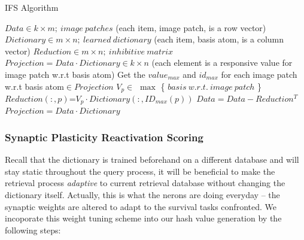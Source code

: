 \documentclass[letterpaper]{article}
\begin{document}
\begin{algorithm}[h]
  \caption{IFS Algorithm}
  \begin{algorithmic}[1]      
    \State $Data  \in k \times m;\ image\ patches  $ (each item, image patch, is a row vector)
    \State $Dictionary \in m \times n;\ learned\ dictionary$ (each item, basis atom, is a column vector)
        \State $Reduction \in m\times n;\ inhibitive\ matrix$
    \State $Projection = Data\cdot Dictionary \in k \times n$ (each element is a responsive value for image patch w.r.t basis atom)
         \State Get the $value_{max}$ and $id_{max}$ for each image patch w.r.t basis atom$\in Projection$
               \State $V_p \in$ $\max$ \{ $basis\ w.r.t.\ image\ patch$ \}
               \State $Reduction(:,p)$=$V_p\cdot Dictionary( : , ID_{max}(p))$
         \EndFor
         \State $Data=Data - Reduction^T$
         \State $Projection = Data\cdot Dictionary$
    \EndFor

  \end{algorithmic}
\end{algorithm}


\subsubsection{Synaptic Plasticity Reactivation Scoring}
Recall that the dictionary is trained beforehand on a different database and will stay static throughout the query process, it will be beneficial to make the retrieval process \emph{adaptive} to current retrieval database without changing the dictionary itself. Actually, this is what the nerons are doing everyday -- the synaptic weights are altered to adapt to the survival tasks confronted. We incoporate this weight tuning scheme into our hash value generation by the following steps:

\end{document}
